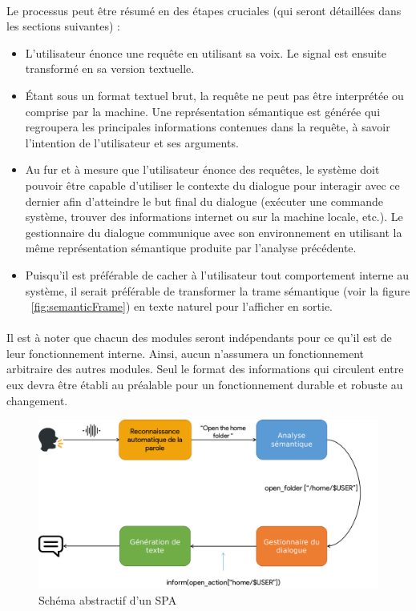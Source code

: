 \paragraph{}
Le processus peut être résumé en des étapes cruciales (qui seront détaillées dans les sections suivantes) : 
\begin{itemize}
	\label{spaLifeCycle}
	\item L'utilisateur énonce une requête en utilisant sa voix. Le signal est ensuite transformé en sa version textuelle.
	\item Étant sous un format textuel brut, la requête ne peut pas être interprétée ou comprise par la machine. Une représentation sémantique est générée qui regroupera les principales informations contenues dans la requête, à savoir l'intention de l'utilisateur et ses arguments.
	\item Au fur et à mesure que l'utilisateur énonce des requêtes, le système doit pouvoir être capable d'utiliser le contexte du dialogue pour interagir avec ce dernier afin d'atteindre le but final du dialogue (exécuter une commande système, trouver des informations internet ou sur la machine locale, etc.). Le gestionnaire du dialogue communique avec son environnement en utilisant la même représentation sémantique produite par l'analyse précédente.
	\item Puisqu'il est préférable de cacher à l'utilisateur tout comportement interne au système, il serait préférable de transformer la trame sémantique (voir la figure ~\ref{fig:semanticFrame}) en texte naturel pour l'afficher en sortie.
\end{itemize}
\paragraph{}
Il est à noter que chacun des modules seront indépendants pour ce qu'il est de leur fonctionnement interne. Ainsi, aucun n'assumera un fonctionnement arbitraire des autres modules. Seul le format des informations qui circulent entre eux devra être établi au préalable pour un fonctionnement durable et robuste au changement.

\begin{figure}[h]
	\centering
	\includegraphics[width=0.8\linewidth]{images/SPA_diagram_2.png}
	\caption{Schéma abstractif d'un SPA \citep{spa_arch}}
	\label{fig:spaDiagram}
\end{figure}

